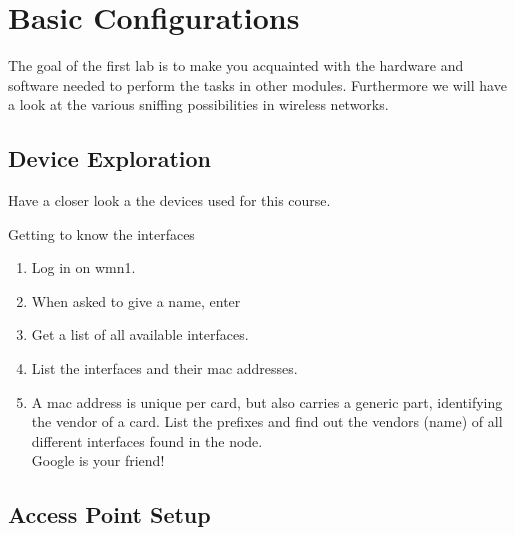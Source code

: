 \setcounter{chapter}{0}
\chapter{Basic Configurations}

The goal of the first lab is to make you acquainted with the hardware and software needed to perform the tasks in other modules. Furthermore we will have a look at the various sniffing possibilities in wireless networks.

\section{Device Exploration}

Have a closer look a the devices used for this course. 

\begin{exercise}{Getting to know the interfaces}
	\begin{enumerate}
		\item Log in on \ac{wmn}1. \newline
		\item When asked to give a name, enter
		\item Get a list of all available interfaces. \newline
		\item List the interfaces and their \ac{mac} addresses.\newline		\begin{esolution}
		\end{esolution}
		\item A \ac{mac} address is unique per card, but also carries a generic part, identifying the vendor of a card. List the prefixes and find out the vendors (name) of all different interfaces found in the node.\\
		\remark Google is your friend!\newline		
		\begin{esolution}
		\end{esolution}
	\end{enumerate}
	
\end{exercise}

\section{Access Point Setup}

